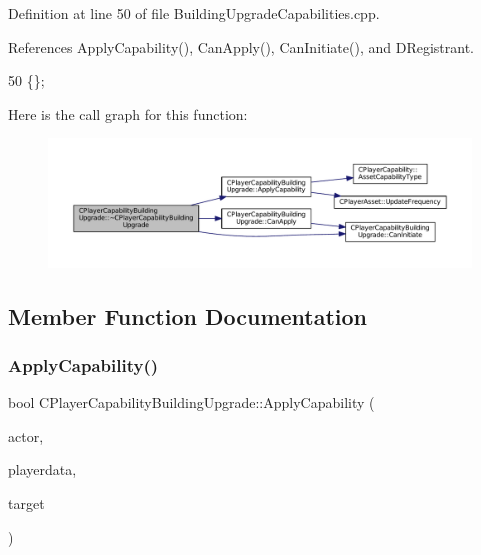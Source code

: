 Definition at line 50 of file Building\+Upgrade\+Capabilities.\+cpp.



References Apply\+Capability(), Can\+Apply(), Can\+Initiate(), and D\+Registrant.


\begin{DoxyCode}
50 \{\};
\end{DoxyCode}
Here is the call graph for this function\+:\nopagebreak
\begin{figure}[H]
\begin{center}
\leavevmode
\includegraphics[width=350pt]{classCPlayerCapabilityBuildingUpgrade_abcef586e377c86c3da3cd698dca268ef_cgraph}
\end{center}
\end{figure}


\subsection{Member Function Documentation}
\hypertarget{classCPlayerCapabilityBuildingUpgrade_a5e71446b74307f31ce6d6e9bbfd9a681}{}\label{classCPlayerCapabilityBuildingUpgrade_a5e71446b74307f31ce6d6e9bbfd9a681} 
\subsubsection{\texorpdfstring{Apply\+Capability()}{ApplyCapability()}}
{\footnotesize\ttfamily bool C\+Player\+Capability\+Building\+Upgrade\+::\+Apply\+Capability (\begin{DoxyParamCaption}\item[{std\+::shared\+\_\+ptr$<$ \hyperlink{classCPlayerAsset}{C\+Player\+Asset} $>$}]{actor,  }\item[{std\+::shared\+\_\+ptr$<$ \hyperlink{classCPlayerData}{C\+Player\+Data} $>$}]{playerdata,  }\item[{std\+::shared\+\_\+ptr$<$ \hyperlink{classCPlayerAsset}{C\+Player\+Asset} $>$}]{target }\end{DoxyParamCaption})\hspace{0.3cm}{\ttfamily [virtual]}}



